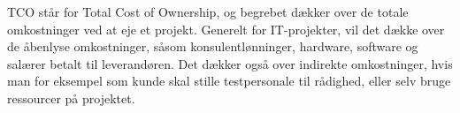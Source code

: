 TCO står for Total Cost of Ownership, og begrebet dækker over de totale
omkostninger ved at eje et projekt. Generelt for IT-projekter, vil det dække
over de åbenlyse omkostninger, såsom konsulentlønninger, hardware, software og
salærer betalt til leverandøren. Det dækker også over indirekte omkostninger,
hvis man for eksempel som kunde skal stille testpersonale til rådighed, eller
selv bruge ressourcer på projektet.


